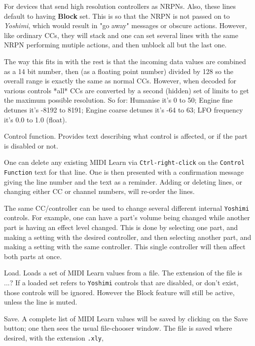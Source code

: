    For devices that send high resolution controllers as NRPNs.
   Also, these lines default to having \textbf{Block} set.
   This is so that the NRPN is
   not passed on to \textsl{Yoshimi}, which would result in "go away" messages
   or obscure actions. However, like ordinary CCs, they will stack and one can set
   several lines with the same NRPN performing mutiple actions, and then unblock
   all but the last one.

   The way this fits in with the rest is that the incoming data values are
   combined as a 14 bit number, then (as a floating point number) divided by 128
   so the overall range is exactly the same as normal CCs.
   However, when decoded for various controls *all* CCs are converted by a second
   (hidden) set of limits to get the maximum possible resolution.
   So for:
   Humanise it's 0 to 50;
   Engine fine detunes it's -8192 to 8191;
   Engine coarse detunes it's -64 to 63;
   LFO frequency it's 0.0 to 1.0 (float).

   Control function.
   Provides text describing what control is affected, or if the
   part is disabled or not.

   One can delete any existing MIDI Learn via
   \texttt{Ctrl-right-click}
   on the
   \texttt{Control Function} text for that line.
   One is then presented with a confirmation message giving the line number and
   the text as a reminder.
   Adding or deleting lines, or changing either CC or channel numbers, will
   re-order the lines.

   The same CC/controller can be used to change several different internal
   \texttt{Yoshimi} controls.  For example, one can have a part's volume being
   changed while another part is having an effect level changed.
   This is done by selecting one part, and making a setting with the desired
   controller, and then selecting another part, and making a setting with the
   same controller.  
   This single controller will then affect both parts at once.

   Load.
   Loads a set of MIDI Learn values from a file.
   The extension of the file is ...?
   If a loaded set refers to \texttt{Yoshimi}
   controls that are disabled, or don't exist, those controls will be ignored.
   However the Block feature will still be active, unless the line is muted.

   Save.
   A complete list of MIDI Learn values
   will be saved by clicking on the Save button; one then sees
   the usual file-chooser window.
   The file is saved where desired, with the extension \texttt{.xly},

